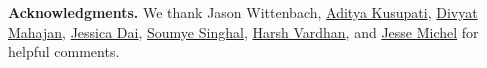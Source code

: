
\noindent\textbf{Acknowledgments.}  
We thank Jason Wittenbach, \href{https://homes.cs.washington.edu/~kusupati/}{Aditya Kusupati}, \href{https://divyat09.github.io}{Divyat Mahajan}, \href{http://jessicadai.com}{Jessica Dai}, \href{https://www.linkedin.com/in/singhalsoumye/}{Soumye Singhal}, \href{https://harshv834.github.io}{Harsh Vardhan}, and 
\href{http://web.mit.edu/jmmichel/www/}{Jesse Michel} for helpful comments. 

